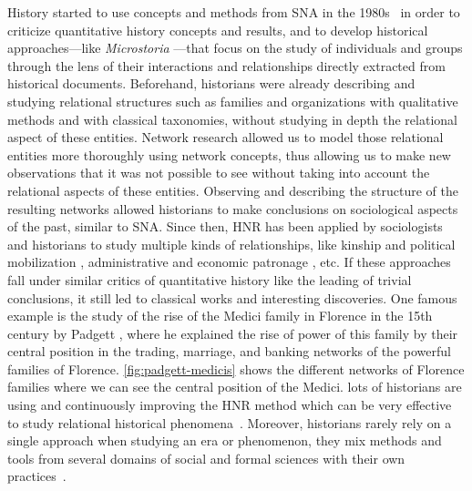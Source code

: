 History started to use concepts and methods from SNA in the 1980s~\cite{wetherellHistoricalSocialNetwork1998} in order to criticize quantitative history concepts and results,
and to develop historical approaches---like \textit{Microstoria} \cite{ginzburgMicrohistoire1981}---that focus on the study of individuals and groups through the lens of their interactions and relationships directly extracted from historical documents.
Beforehand, historians were already describing and studying relational structures such as families and organizations with qualitative methods and with classical taxonomies, without studying in depth the relational aspect of these entities.
Network research allowed us to model those relational entities more thoroughly using network concepts, thus allowing us to make new observations that it was not possible to see without taking into account the relational aspects of these entities.
Observing and describing the structure of the resulting networks allowed historians to make conclusions on sociological aspects of the past, similar to SNA.
Since then, HNR has been applied by sociologists and historians to study multiple kinds of relationships, like kinship and political mobilization \cite{lippKinshipNetworksLocal2005}, administrative and economic patronage \cite{moutoukias1992}, etc.
If these approaches fall under similar critics of quantitative history \cite{lemercier12FormalNetwork2015} like the leading of trivial conclusions, it still led to classical works and interesting discoveries.
One famous example is the study of the rise of the Medici family in Florence in the 15th century by Padgett \cite{padgettRobustActionRise1993}, where he explained the rise of power of this family by their central position in the trading, marriage, and banking networks of the powerful families of Florence. \autoref{fig:padgett-medicis} shows the different networks of Florence families where we can see the central position of the Medici.
lots of historians are using and continuously improving the HNR method which can be very effective to study relational historical phenomena~\cite{kerschbaumerPowerNetworksProspects2015}.
Moreover, historians rarely rely on a single approach when studying an era or phenomenon, they mix methods and tools from several domains of social and formal sciences with their own practices~\cite{padgettRobustActionRise1993, petzCombiningNetworkResearch2022}.


